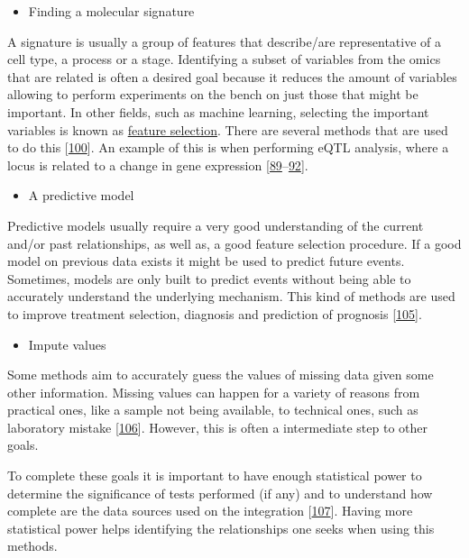 \documentclass[
  12pt,
  a4paper,
  twoside,
  openright]{book}
\providecommand{\tightlist}{%
  \setlength{\itemsep}{0pt}\setlength{\parskip}{0pt}}
\begin{document}
\begin{itemize}
\tightlist
\item
  Finding a molecular signature
\end{itemize}

A signature is usually a group of features that describe/are representative of a cell type, a process or a stage.
Identifying a subset of variables from the omics that are related is often a desired goal because it reduces the amount of variables allowing to perform experiments on the bench on just those that might be important.
In other fields, such as machine learning, selecting the important variables is known as \href{https://en.wikipedia.org/wiki/Feature_selection}{feature selection}.
There are several methods that are used to do this {[}\protect\hyperlink{ref-cavill2016}{100}{]}.
An example of this is when performing eQTL analysis, where a locus is related to a change in gene expression {[}\protect\hyperlink{ref-repnik2016}{89}--\protect\hyperlink{ref-dai2019}{92}{]}.

\begin{itemize}
\tightlist
\item
  A predictive model
\end{itemize}

Predictive models usually require a very good understanding of the current and/or past relationships, as well as, a good feature selection procedure.
If a good model on previous data exists it might be used to predict future events.
Sometimes, models are only built to predict events without being able to accurately understand the underlying mechanism.
This kind of methods are used to improve treatment selection, diagnosis and prediction of prognosis {[}\protect\hyperlink{ref-wheeler2014}{105}{]}.

\begin{itemize}
\tightlist
\item
  Impute values
\end{itemize}

Some methods aim to accurately guess the values of missing data given some other information.
Missing values can happen for a variety of reasons from practical ones, like a sample not being available, to technical ones, such as laboratory mistake {[}\protect\hyperlink{ref-yin2019}{106}{]}.
However, this is often a intermediate step to other goals.

To complete these goals it is important to have enough statistical power to determine the significance of tests performed (if any) and to understand how complete are the data sources used on the integration {[}\protect\hyperlink{ref-tarazona2021}{107}{]}.
Having more statistical power helps identifying the relationships one seeks when using this methods.
\end{document}

